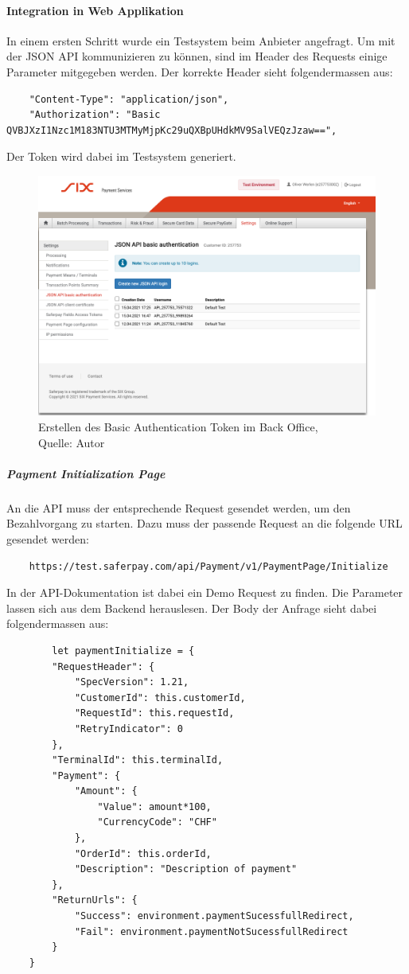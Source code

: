  \paragraph{Integration in Web Applikation}
 In einem ersten Schritt wurde ein Testsystem beim Anbieter angefragt.
 Um mit der JSON API kommunizieren zu können, sind im Header des Requests einige Parameter mitgegeben werden. Der korrekte Header sieht folgendermassen aus: 
 \begin{verbatim}
	"Content-Type": "application/json", 
	"Authorization": "Basic QVBJXzI1Nzc1M183NTU3MTMyMjpKc29uQXBpUHdkMV9SalVEQzJzaw==",
 \end{verbatim}
Der Token wird dabei im Testsystem generiert. 
\begin{figure}[H]
	\centering
	\includegraphics[width=1\textwidth]{images/basicAuth.PNG}
	\caption[Erstellen des Basic Authentication Token im Back Office]{Erstellen des Basic Authentication Token im Back Office,\\ Quelle: Autor}
	\label{img: basicAuth}
\end{figure} 
 \subparagraph{Payment Initialization Page}
 An die API muss der entsprechende Request gesendet werden, um den Bezahlvorgang zu starten. Dazu muss der passende Request an die folgende URL gesendet werden: 
 \begin{verbatim}
 	https://test.saferpay.com/api/Payment/v1/PaymentPage/Initialize
 \end{verbatim}
In der API-Dokumentation ist dabei ein Demo Request zu finden. Die Parameter lassen sich aus dem Backend herauslesen. 
Der Body der Anfrage sieht dabei folgendermassen aus: 
\begin{verbatim}
	    let paymentInitialize = {
		"RequestHeader": {
			"SpecVersion": 1.21,
			"CustomerId": this.customerId,
			"RequestId": this.requestId,
			"RetryIndicator": 0
		},
		"TerminalId": this.terminalId,
		"Payment": {
			"Amount": {
				"Value": amount*100,
				"CurrencyCode": "CHF"
			},
			"OrderId": this.orderId,
			"Description": "Description of payment"
		},
		"ReturnUrls": {
			"Success": environment.paymentSucessfullRedirect,
			"Fail": environment.paymentNotSucessfullRedirect
		}
	}
\end{verbatim}
